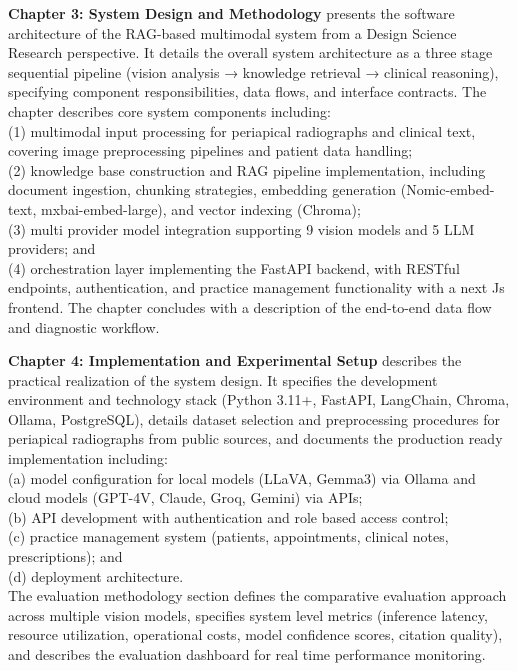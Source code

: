 \documentclass[12pt,a4paper]{report}
\begin{document}
	\textbf{Chapter 3: System Design and Methodology} presents the software architecture of the RAG-based multimodal system from a Design Science Research perspective. It details the overall system architecture as a three stage sequential pipeline (vision analysis → knowledge retrieval → clinical reasoning), specifying component responsibilities, data flows, and interface contracts. The chapter describes core system components including: \\
	(1) multimodal input processing for periapical radiographs and clinical text, covering image preprocessing pipelines and patient data handling; \\
	(2) knowledge base construction and RAG pipeline implementation, including document ingestion, chunking strategies, embedding generation (Nomic-embed-text, mxbai-embed-large), and vector indexing (Chroma); \\
	(3) multi provider model integration supporting 9 vision models and 5 LLM providers; and \\
	(4) orchestration layer implementing the FastAPI backend,  with RESTful endpoints, authentication, and practice management functionality with a next Js frontend. The chapter concludes with a description of the end-to-end data flow and diagnostic workflow.
	
	\textbf{Chapter 4: Implementation and Experimental Setup} describes the practical realization of the system design. It specifies the development environment and technology stack (Python 3.11+, FastAPI, LangChain, Chroma, Ollama, PostgreSQL), details dataset selection and preprocessing procedures for periapical radiographs from public sources, and documents the production ready implementation including:\\
	(a) model configuration for local models (LLaVA, Gemma3) via Ollama and cloud models (GPT-4V, Claude, Groq, Gemini) via APIs; \\(b) API development with authentication and role based access control;  \\
	(c) practice management system (patients, appointments, clinical notes, prescriptions); and \\
	(d) deployment architecture. \\
	The evaluation methodology section defines the comparative evaluation approach across multiple vision models, specifies system level metrics (inference latency, resource utilization, operational costs, model confidence scores, citation quality), and describes the evaluation dashboard for real time performance monitoring.
	
\end{document}
